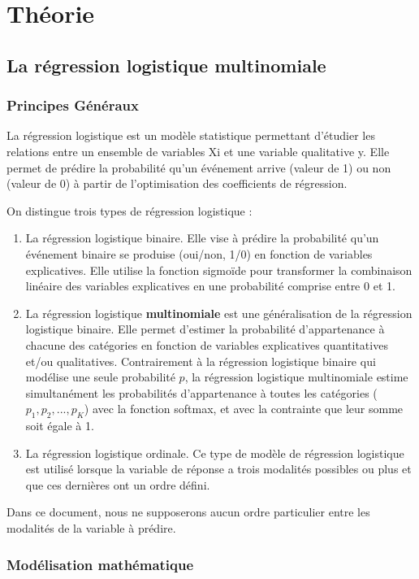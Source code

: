 \documentclass[10pt,french]{report}
\begin{document}
	\chapter{Théorie}

	\section{La régression logistique multinomiale}
	\subsection{Principes Généraux}
	La régression logistique est un modèle statistique permettant d'étudier les relations entre un ensemble de variables Xi et une variable qualitative y. Elle permet de prédire la probabilité qu'un événement arrive (valeur de 1) ou non (valeur de 0) à partir de l'optimisation des coefficients de régression.

	On distingue trois types de régression logistique :
	\begin{enumerate}
		\item La régression logistique binaire. Elle vise à prédire la probabilité qu'un événement binaire se produise (oui/non, 1/0) en fonction de variables explicatives. Elle utilise la fonction sigmoïde pour transformer la combinaison linéaire des variables explicatives en une probabilité comprise entre 0 et 1.
		\item La régression logistique \textbf{multinomiale} est une généralisation de la régression logistique binaire. Elle permet d'estimer la probabilité d'appartenance à chacune des catégories en fonction de variables explicatives quantitatives et/ou qualitatives. Contrairement à la régression logistique binaire qui modélise une seule probabilité $p$, la régression logistique multinomiale estime simultanément les probabilités d'appartenance à toutes les catégories ($p_1, p_2, ..., p_K$) avec la fonction softmax, et avec la contrainte que leur somme soit égale à 1.
		\item La régression logistique ordinale. Ce type de modèle de régression logistique est utilisé lorsque la variable de réponse a trois modalités possibles ou plus et que ces dernières ont un ordre défini.
	\end{enumerate}

	Dans ce document, nous ne supposerons aucun ordre particulier entre les modalités de la variable à prédire.

    \subsection{Modélisation mathématique}
\end{document}
